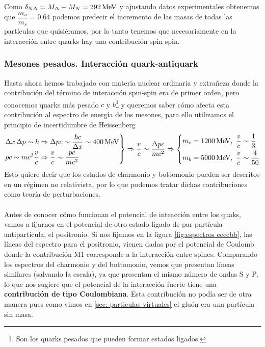 Como $\delta_{N\Delta}=M_\Delta-M_N=\unit[292]{MeV}$ y ajustando datos experimentales obtenemos que $\dfrac{m_u}{m_s}=0.64$ podemos predecir el incremento de las masas de todas las partículas que quisiéramos, por lo tanto tenemos que necesariamente en la interacción entre quarks hay una contribución spin-spin.

\subsubsection{Mesones pesados. Interacción quark-antiquark}

Hasta ahora hemos trabajado con materia nuclear ordinaria y extrañeza donde la contribución del término de interacción spin-spin era de primer orden, pero conocemos quarks más pesado $c$ y $b$\footnote{Son los quarks pesados que pueden formar estados ligados.} y queremos saber cómo afecta esta contribución al espectro de energía de los mesones, para ello utilizamos el principio de incertidumbre de Heissenberg
\begin{equation*}
    \left.\begin{aligned}
        &\Delta x \, \Delta p \sim \hbar \Rightarrow \Delta p c \sim\frac{\hbar c}{\Delta x} \sim \unit[400]{MeV} \\
        &pc\sim mc^2 \frac{v}{c} \Rightarrow \frac{v}{c} \sim \frac{pc}{mc^2}
    \end{aligned} \right \} \Rightarrow \frac{v}{c} \sim \frac{\Delta pc}{mc^2}\Rightarrow \left \{ 
    \begin{aligned}
        &m_c=\unit[1200]{MeV} ,  \ \frac{v}{c}\sim \frac{1}{3}\\
        &m_b=\unit[5000]{MeV} , \ \frac{v}{c}\sim \frac{4}{50}
    \end{aligned}
    \right.
\end{equation*}
Esto quiere decir que los estados de charmonio y bottomonio pueden ser descritos en un régimen no relativista, por lo que podemos tratar dichas contribuciones como teoría de perturbaciones.\\\\
Antes de conocer cómo funcionan el potencial de inteacción entre los quaks, vamos a fijarnos en el potencial de otro estado ligado de par partícula antipartícula, el positronio. 
Si nos fijamos en la figura \ref{fig:espectros eeccbb}, las líneas del espectro para el positronio, vienen dadas por el potencial de Coulomb donde la contribución M1 corresponde a la interacción entre spines. Comparando los espectros del charmonio y del bottomonio, vemos que presentan líneas similares (salvando la escala), ya que presentan el mismo número de ondas S y P, lo que nos sugiere que el potencial de la interacción fuerte tiene una \textbf{contribución de tipo Coulombiana}. Esta contribución no podía ser de otra manera pues como vimos en \ref{sec: particulas virtuales} el gluón era una partícula sin masa.
